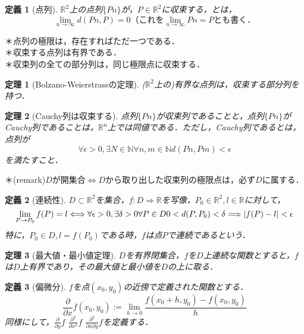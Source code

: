 \documentclass[uplatex, 12pt, a4paper]{jsarticle}
\newtheorem{theorem}{定理}
\newtheorem{definition}{定義}
\begin{document}
\begin{definition}[点列]$\mathbb{R}^2$上の点列$\{Pn\}$が，$P\in \mathbb{R}^2$に収束する，とは，$$\lim_{n\to \infty} d(Pn,P)=0 \mathrm{（これを} \lim_{n\to \infty} Pn=P \mathrm{とも書く．} $$
\end{definition}
\noindent
＊点列の極限は，存在すればただ一つである．\\
＊収束する点列は有界である．\\
＊収束列の全ての部分列は，同じ極限点に収束する．
\begin{theorem}[Bolzano-Weierstrassの定理]($\mathbb{R}^2$上の)有界な点列は，収束する部分列を持つ．\end{theorem}
\begin{theorem}[Cauchy列は収束する]点列$\{ Pn \}$が収束列であることと，点列$\{ Pn \}$がCauchy列であることは，$\mathbb{R}^n$上では同値である．ただし，Cauchy列であるとは，点列が$$\forall \epsilon >0, \exists N \in \mathbb{N} \forall n,m \in \mathbb{N} d(Pn,Pm)<\epsilon $$を満たすこと． \end{theorem}
\noindent
＊(remark)$D$が開集合$\Longleftrightarrow D$から取り出した収束列の極限点は，必ず$D$に属する．

\begin{definition}[連続性]$D \subset \mathbb{R}^2$を集合，$f:D \Longrightarrow \mathbb{R}$を写像，$P_0 \in \mathbb{R}^2, l \in \mathbb{R}$に対して，$$ \lim_{P \to P_0} f(P)=l \\ \Longleftrightarrow \forall \epsilon >0, \exists \delta>0 \forall P\in D 0<d(P,P_0)<\delta \Longrightarrow |f(P)-l|<\epsilon$$特に，$P_0 \in D, l=f(P_0)$である時，$f$は点$P$で連続であるという．\end{definition}

\begin{theorem}[最大値・最小値定理]\label{maxmin}$D$を有界閉集合，$f$を$D$上連続な関数とすると，$f$は$D$上有界であり，その最大値と最小値を$D$の上に取る．\end{theorem}

\begin{definition}[偏微分]$f$を点$(x_0,y_0)$の近傍で定義された関数とする．$$\frac{\partial}{\partial x}f(x_0,y_0):=\lim_{h\to 0} \frac{f(x_0+h,y_0)-f(x_0,y_0)}{h}$$同様にして，$\frac{\partial}{\partial y}f$ $\frac{\partial^2}{\partial x^2}f$ $\frac{\partial^2}{\partial x \partial y}f$を定義する．\end{definition}
\end{document}
